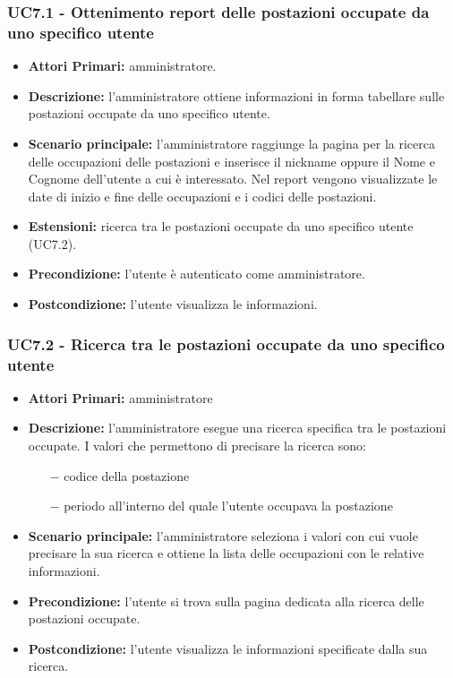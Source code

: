 \subsubsection{ UC7.1 - Ottenimento report delle postazioni occupate da uno specifico utente}
\begin{itemize}
           	\item\textbf{Attori Primari:} 
           	amministratore.
           	\item\textbf{Descrizione:} 
           	l'amministratore ottiene informazioni in forma tabellare sulle postazioni occupate da uno specifico utente.
           	\item\textbf{Scenario principale:} 
           	l'amministratore raggiunge la pagina per la ricerca delle occupazioni delle postazioni e inserisce il nickname oppure il Nome e Cognome dell'utente a cui è interessato.
           	Nel report vengono visualizzate le date di inizio e fine delle occupazioni e i codici delle postazioni.
           	\item\textbf{Estensioni:}
           	ricerca tra le postazioni occupate da uno specifico utente (UC7.2).
           	\item\textbf{Precondizione:} 
           	l'utente è autenticato come amministratore.
           	\item\textbf{Postcondizione:}
           	l'utente visualizza le informazioni.
\end{itemize}


\subsubsection{ UC7.2 - Ricerca tra le postazioni occupate da uno specifico utente}
\begin{itemize}
	\item\textbf{Attori Primari:} 
	amministratore
	\item\textbf{Descrizione:} 
	l'amministratore esegue una ricerca specifica tra le postazioni occupate.
	I valori che permettono di precisare la ricerca sono:
	\begin{itemize}
		\item[$-$] codice della postazione
		\item[$-$] periodo all'interno del quale l'utente occupava la postazione
	\end{itemize}
	\item\textbf{Scenario principale:} 
	l'amministratore seleziona i valori con cui vuole precisare la sua ricerca e ottiene la lista delle occupazioni con le relative informazioni.
	\item\textbf{Precondizione:} 
	l'utente si trova sulla pagina dedicata alla ricerca delle postazioni occupate.
	\item\textbf{Postcondizione:}
	l'utente visualizza le informazioni specificate dalla sua ricerca.
\end{itemize}


